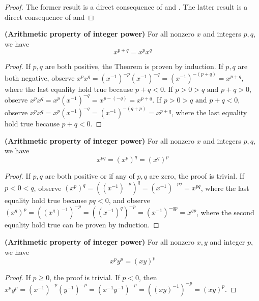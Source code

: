 \documentclass{report}
\begin{document}
\begin{proof}
The former result is a direct consequence of  and . The latter result is a direct consequence of  and   
\end{proof}
\begin{theorem}  
\label{1.2.12}
 \textbf{(Arithmetic property of integer power)} For all nonzero $x$ and integers $p,q$, we have 
 \begin{equation*}
x^{p+q}=x^px^{q}
\end{equation*}
\end{theorem}
\begin{proof}
  If $p,q$ are both positive, the Theorem is proven by induction. If $p,q$ are both negative, observe $x^px^q=(x^{-1})^{-p}(x^{-1})^{-q}=(x^{-1})^{-(p+q)}=x^{p+q}$, where the last equality hold true because $p+q<0$. If $p>0>q\text{ and }p+q>0$, observe $x^px^q=x^p(x^{-1})^{-q}=x^{p-(-q)}=x^{p+q}$. If $p>0>q\text{ and }p+q<0$, observe $x^px^q=x^p(x^{-1})^{-q}=(x^{-1})^{-(q+p)}=x^{p+q}$, where the last equality hold true because $p+q<0.$ 
\end{proof}
\begin{theorem}
\label{1.2.13}
\textbf{(Arithmetic property of integer power)} For all nonzero $x$ and integers $p,q$, we have
\begin{equation*}
  x^{pq}=(x^p)^q=(x^q)^p
\end{equation*}
\end{theorem}
\begin{proof}
  If $p,q$ are both positive or if any of $p,q$ are zero, the proof is trivial. If $p<0<q$, observe $(x^p)^q=((x^{-1})^{-p})^q=(x^{-1})^{-pq}=x^{pq}$, where the last equality hold true because $pq<0$, and observe $(x^q)^p=((x^q)^{-1})^{-p}=((x^{-1})^{q})^{-p}=(x^{-1})^{-qp}=x^{qp}$, where the second equality hold true can be proven by induction.    
\end{proof}
\begin{theorem}
\label{1.2.14}
\textbf{(Arithmetic property of integer power)} For all nonzero $x,y$ and integer  $p$, we have
 \begin{equation*}
x^py^p=(xy)^p
\end{equation*}
\end{theorem}
\begin{proof}
If $p\geq 0$, the proof is trivial. If $p<0$, then $x^py^p=(x^{-1})^{-p}(y^{-1})^{-p}=(x^{-1}y^{-1})^{-p}=((xy)^{-1})^{-p}=(xy)^p$.
\end{proof}
\end{document}
